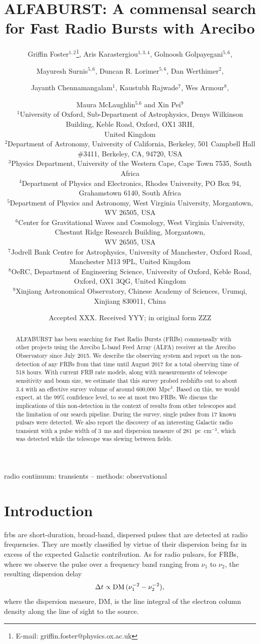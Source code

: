 \documentclass[a4paper,fleqn,usenatbib]{mnras}
\title[The ALFABURST Commensal FRB Survey]{ALFABURST: A commensal search for
Fast Radio Bursts with Arecibo}
\author[G. Foster et al.]{Griffin Foster$^{1,2}$\thanks{E-mail: griffin.foster@physics.ox.ac.uk},
Aris Karastergiou$^{1,3,4}$,
Golnoosh Golpayegani$^{5,6}$,
\and Mayuresh Surnis$^{5,6}$, 
Duncan R. Lorimer$^{5,6}$,
Dan Werthimer$^{2}$,
\and Jayanth Chennamangalam$^{1}$,
Kaustubh Rajwade$^{7}$,
Wes Armour$^{8}$,
\and Maura McLaughlin$^{5.6}$ and
Xin Pei$^{9}$
\\
$^{1}$University of Oxford, Sub-Department of Astrophysics, Denys Wilkinson Building, Keble Road, Oxford, OX1 3RH,\\United Kingdom\\
$^{2}$Department of Astronomy, University of California, Berkeley, 501 Campbell Hall \#3411, Berkeley, CA, 94720, USA\\
$^{3}$Physics Department, University of the Western Cape, Cape Town 7535, South Africa\\
$^{4}$Department of Physics and Electronics, Rhodes University, PO Box 94, Grahamstown 6140, South Africa\\
$^{5}$Department of Physics and Astronomy, West Virginia University, Morgantown, WV 26505, USA\\
$^{6}$Center for Gravitational Waves and Cosmology, West Virginia University, Chestnut Ridge Research Building, Morgantown,\\ WV 26505, USA\\
$^{7}$Jodrell Bank Centre for Astrophysics, University of Manchester, Oxford Road, Manchester M13 9PL, United Kingdom\\ 
$^{8}$OeRC, Department of Engineering Science, University of Oxford, Keble Road, Oxford, OX1 3QG, United Kingdom\\
$^{9}$Xinjiang Astronomical Observatory, Chinese Academy of Sciences, Urumqi, Xinjiang 830011, China\\
}
\date{Accepted XXX. Received YYY; in original form ZZZ}
\begin{document}
\label{firstpage}
\pagerange{\pageref{firstpage}--\pageref{lastpage}}
\maketitle

\begin{abstract}
ALFABURST has been searching for Fast Radio Bursts (FRBs) commensally with other
projects using the Arecibo L-band Feed Array (ALFA) receiver at the Arecibo
Observatory since July 2015. We describe the observing system and report on the
non-detection of any FRBs from that time until August 2017 for a total observing
time of 518 hours.  With current FRB rate models, along with measurements of
telescope sensitivity and beam size, we estimate that this survey probed
redshifts out to about 3.4 with an effective survey volume of around
600,000~Mpc$^3$. Based on this, we would expect, at the 99\% confidence level,
to see at most two FRBs.  We discuss the implications of this non-detection in
the context of results from other telescopes and the limitation of our search
pipeline.  During the survey, single pulses from 17 known pulsars were detected.
We also report the discovery of an interesting Galactic radio transient with a
pulse width of 3~ms and dispersion measure of 281~pc~cm$^{-3}$, which was
detected while the telescope was slewing between fields.
\end{abstract}

\begin{keywords}
radio continuum: transients -- methods: observational
\end{keywords}


\section{Introduction}
\label{sec:intro}

\glspl{frb} are short-duration, broad-band, dispersed pulses that are detected
at radio frequencies. They are mostly classified by virtue of their dispersion
being far in excess of the expected Galactic contribution. As for radio pulsars,
for FRBs, where we observe the pulse over a frequency band ranging from $\nu_1$
to $\nu_2$, the resulting dispersion delay 
%
\begin{equation}
\Delta t \propto {\rm DM} \, (\nu_1^{-2} - \nu_2^{-2}),
\end{equation}
%
where the dispersion measure, DM, is the line integral of the electron column
density along the line of sight to the source.
\end{document}
